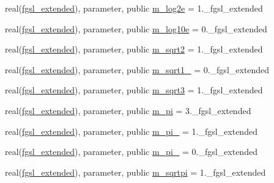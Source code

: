 \begin{DoxyCompactItemize}
\item 
real(\hyperlink{namespacefgsl_a9f38abe97062020e8a507aaa5bc683ab}{fgsl\+\_\+extended}), parameter, public \hyperlink{namespacefgsl_a93d2e5a473874e31cbcf8de12963fd8e}{m\+\_\+log2e} = 1.\+\_\+fgsl\+\_\+extended
\item 
real(\hyperlink{namespacefgsl_a9f38abe97062020e8a507aaa5bc683ab}{fgsl\+\_\+extended}), parameter, public \hyperlink{namespacefgsl_a64dfb3018d641c61312823bf56c85023}{m\+\_\+log10e} = 0.\+\_\+fgsl\+\_\+extended
\item 
real(\hyperlink{namespacefgsl_a9f38abe97062020e8a507aaa5bc683ab}{fgsl\+\_\+extended}), parameter, public \hyperlink{namespacefgsl_a7d0e2199519f7100527499e3c206fc31}{m\+\_\+sqrt2} = 1.\+\_\+fgsl\+\_\+extended
\item 
real(\hyperlink{namespacefgsl_a9f38abe97062020e8a507aaa5bc683ab}{fgsl\+\_\+extended}), parameter, public \hyperlink{namespacefgsl_aa15c7774ec8561b9221b81138e50d715}{m\+\_\+sqrt1\+\_} = 0.\+\_\+fgsl\+\_\+extended
\item 
real(\hyperlink{namespacefgsl_a9f38abe97062020e8a507aaa5bc683ab}{fgsl\+\_\+extended}), parameter, public \hyperlink{namespacefgsl_acdd93c47924b7382b9ab00728cc46b9f}{m\+\_\+sqrt3} = 1.\+\_\+fgsl\+\_\+extended
\item 
real(\hyperlink{namespacefgsl_a9f38abe97062020e8a507aaa5bc683ab}{fgsl\+\_\+extended}), parameter, public \hyperlink{namespacefgsl_a8af1e390793c77a120b600e4844495dc}{m\+\_\+pi} = 3.\+\_\+fgsl\+\_\+extended
\item 
real(\hyperlink{namespacefgsl_a9f38abe97062020e8a507aaa5bc683ab}{fgsl\+\_\+extended}), parameter, public \hyperlink{namespacefgsl_af8cd74655823aa30933d33b51ac35bbc}{m\+\_\+pi\+\_} = 1.\+\_\+fgsl\+\_\+extended
\item 
real(\hyperlink{namespacefgsl_a9f38abe97062020e8a507aaa5bc683ab}{fgsl\+\_\+extended}), parameter, public \hyperlink{namespacefgsl_ac72cdbd05abd60541bd253d571673cf4}{m\+\_\+pi\+\_} = 0.\+\_\+fgsl\+\_\+extended
\item 
real(\hyperlink{namespacefgsl_a9f38abe97062020e8a507aaa5bc683ab}{fgsl\+\_\+extended}), parameter, public \hyperlink{namespacefgsl_aa32be73a066aea0217a624284ae34c39}{m\+\_\+sqrtpi} = 1.\+\_\+fgsl\+\_\+extended
\item 

\end{DoxyCompactItemize}
